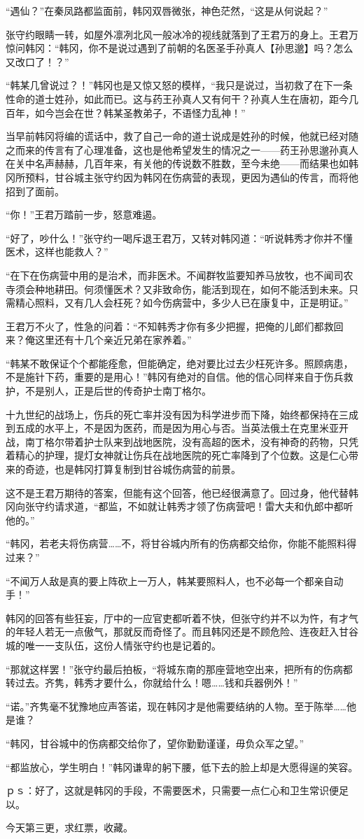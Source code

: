 “遇仙？”在秦凤路都监面前，韩冈双唇微张，神色茫然，“这是从何说起？”

张守约眼睛一转，如屋外凛冽北风一般冰冷的视线就落到了王君万的身上。王君万惊问韩冈：“韩冈，你不是说过遇到了前朝的名医圣手孙真人【孙思邈】吗？怎么又改口了！？”

“韩某几曾说过？！”韩冈也是又惊又怒的模样，“我只是说过，当初救了在下一条性命的道士姓孙，如此而已。这与药王孙真人又有何干？孙真人生在唐初，距今几百年，如今岂会在世？韩某圣教弟子，不语怪力乱神！”

当早前韩冈将编的谎话中，救了自己一命的道士说成是姓孙的时候，他就已经对随之而来的传言有了心理准备，这也是他希望发生的情况之一——药王孙思邈孙真人在关中名声赫赫，几百年来，有关他的传说数不胜数，至今未绝——而结果也如韩冈所预料，甘谷城主张守约因为韩冈在伤病营的表现，更因为遇仙的传言，而将他招到了面前。

“你！”王君万踏前一步，怒意难遏。

“好了，吵什么！”张守约一喝斥退王君万，又转对韩冈道：“听说韩秀才你并不懂医术，这样也能救人？”

“在下在伤病营中用的是治术，而非医术。不闻群牧监要知养马放牧，也不闻司农寺须会种地耕田。何须懂医术？又非致命伤，能活到现在，如何不能活到未来。只需精心照料，又有几人会枉死？如今伤病营中，多少人已在康复中，正是明证。”

王君万不火了，性急的问着：“不知韩秀才你有多少把握，把俺的儿郎们都救回来？俺这里还有十几个亲近兄弟在家养着。”

“韩某不敢保证个个都能痊愈，但能确定，绝对要比过去少枉死许多。照顾病患，不是施针下药，重要的是用心！”韩冈有绝对的自信。他的信心同样来自于伤兵救护，不是别人，正是后世的传奇护士南丁格尔。

十九世纪的战场上，伤兵的死亡率并没有因为科学进步而下降，始终都保持在三成到五成的水平上，不是因为医药，而是因为用心与否。当英法俄土在克里米亚开战，南丁格尔带着护士队来到战地医院，没有高超的医术，没有神奇的药物，只凭着精心的护理，提灯女神就让伤兵在战地医院的死亡率降到了个位数。这是仁心带来的奇迹，也是韩冈打算复制到甘谷城伤病营的前景。

这不是王君万期待的答案，但能有这个回答，他已经很满意了。回过身，他代替韩冈向张守约请求道，“都监，不如就让韩秀才领了伤病营吧！雷大夫和仇郎中都听他的。”

“韩冈，若老夫将伤病营……不，将甘谷城内所有的伤病都交给你，你能不能照料得过来？”

“不闻万人敌是真的要上阵砍上一万人，韩某要照料人，也不必每一个都亲自动手！”

韩冈的回答有些狂妄，厅中的一应官吏都听着不快，但张守约并不以为忤，有才气的年轻人若无一点傲气，那就反而奇怪了。而且韩冈还是不顾危险、连夜赶入甘谷城的唯一一支队伍，这份人情张守约也是记着的。

“那就这样罢！”张守约最后拍板，“将城东南的那座营地空出来，把所有的伤病都转过去。齐隽，韩秀才要什么，你就给什么！嗯……钱和兵器例外！”

“诺。”齐隽毫不犹豫地应声答诺，现在韩冈才是他需要结纳的人物。至于陈举……他是谁？

“韩冈，甘谷城中的伤病都交给你了，望你勤勤谨谨，毋负众军之望。”

“都监放心，学生明白！”韩冈谦卑的躬下腰，低下去的脸上却是大愿得逞的笑容。

ｐｓ：好了，这就是韩冈的手段，不需要医术，只需要一点仁心和卫生常识便足以。

今天第三更，求红票，收藏。

